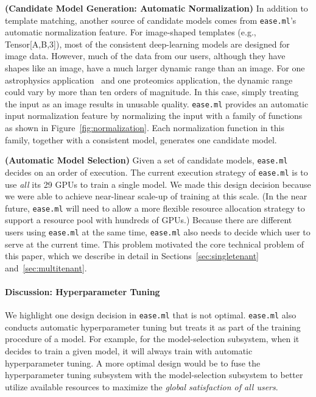 \documentclass[letterpaper]{vldb}
\newcommand{\eml}{\texttt{ease.ml}\xspace}
\begin{document}
\vspace{0.5em}
\noindent
{\bf (Candidate Model Generation: Automatic Normalization)} 
In addition to template matching, another source of candidate models 
comes from \eml's automatic normalization feature.
For image-shaped templates (e.g., Tensor[A,B,3]),
most of the consistent deep-learning models are designed for
image data. However, much of the data from our users, although
they have shapes like an image, have a much larger dynamic
range than an image. For one astrophysics application~\cite{Schawinski2017}
and one proteomics application, the dynamic range could
vary by more than ten orders of magnitude. In this case,
simply treating the input as an image results in unusable 
quality. \eml provides an automatic input
normalization feature by normalizing the input
with a family of functions as shown in Figure~\ref{fig:normalization}.
Each normalization function in this family, together with 
a consistent model, generates one  
candidate model.

\vspace{0.5em}
\noindent
{\bf (Automatic Model Selection)} 
Given a set of candidate models, \eml decides on an order of
execution. The current execution strategy of \eml is to 
use {\em all} its 29 GPUs to train a single 
model. We made this design decision 
because we were able to achieve near-linear scale-up
of training at this scale. (In the near 
future, \eml will need to allow a more flexible resource 
allocation strategy to support a resource pool 
with hundreds of GPUs.) Because there are different
users using \eml at the same time, \eml also needs
to decide which user to serve at the current time.
This problem motivated the core technical problem of this paper,
which we describe in detail in Sections~\ref{sec:singletenant} and~\ref{sec:multitenant}.

\vspace{-1em}
\paragraph*{Discussion: Hyperparameter Tuning}
We highlight one design decision in \eml
that is not optimal. \eml also conducts automatic
hyperparameter tuning but treats it as part of the
training procedure of a model. For example, for the model-selection
subsystem, when it decides to train a given model,
it will always train with
automatic hyperparameter tuning. A more optimal design 
would be to fuse the hyperparameter tuning subsystem
with the model-selection subsystem to better
utilize available resources to maximize the
{\em global satisfaction of all users}.
\end{document}
